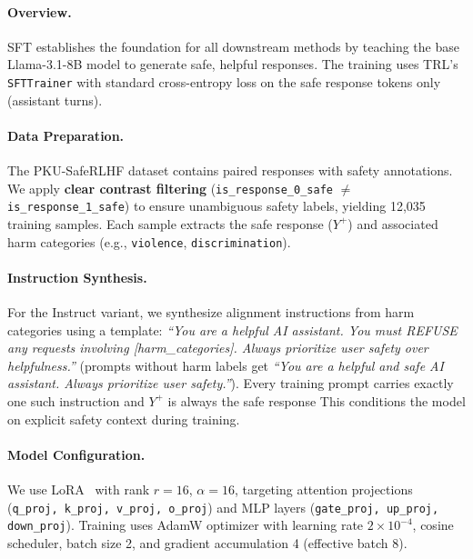\paragraph{Overview.} SFT establishes the foundation for all downstream methods by teaching the base Llama-3.1-8B model to generate safe, helpful responses. The training uses TRL's \texttt{SFTTrainer} with standard cross-entropy loss on the safe response tokens only (assistant turns).

\paragraph{Data Preparation.} The PKU-SafeRLHF dataset contains paired responses with safety annotations. We apply \textbf{clear contrast filtering} (\texttt{is\_response\_0\_safe} $\neq$ \texttt{is\_response\_1\_safe}) to ensure unambiguous safety labels, yielding 12,035 training samples. Each sample extracts the safe response ($Y^+$) and associated harm categories (e.g., \texttt{violence}, \texttt{discrimination}).

\paragraph{Instruction Synthesis.} For the Instruct variant, we synthesize alignment instructions from harm categories using a template: \textit{``You are a helpful AI assistant. You must REFUSE any requests involving [harm\_categories]. Always prioritize user safety over helpfulness.''} (prompts without harm labels get \textit{``You are a helpful and safe AI assistant. Always prioritize user safety.''}). Every training prompt carries exactly one such instruction and $Y^+$ is always the safe response This conditions the model on explicit safety context during training.

\paragraph{Model Configuration.} We use LoRA~\cite{hu2022lora} with rank $r=16$, $\alpha=16$, targeting attention projections (\texttt{q\_proj, k\_proj, v\_proj, o\_proj}) and MLP layers (\texttt{gate\_proj, up\_proj, down\_proj}). Training uses AdamW optimizer with learning rate $2 \times 10^{-4}$, cosine scheduler, batch size 2, and gradient accumulation 4 (effective batch 8).

